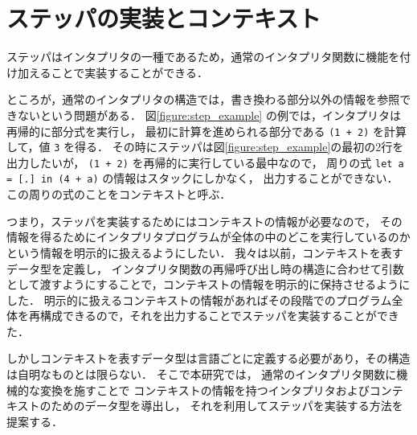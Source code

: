 \section{ステッパの実装とコンテキスト}
\label{section:context}

ステッパはインタプリタの一種であるため，通常のインタプリタ関数に機能を付け加えることで実装することができる．

ところが，通常のインタプリタの構造では，書き換わる部分以外の情報を参照できないという問題がある．
図\ref{figure:step_example} の例では，インタプリタは再帰的に部分式を実行し，
最初に計算を進められる部分である \texttt{(1 + 2)} を計算して，値 \texttt{3} を得る．
その時にステッパは図\ref{figure:step_example}の最初の2行を出力したいが，
\texttt{(1 + 2)} を再帰的に実行している最中なので，
周りの式 \texttt{let a = [.] in (4 + a)} の情報はスタックにしかなく，
出力することができない．
この周りの式のことをコンテキストと呼ぶ．

つまり，ステッパを実装するためにはコンテキストの情報が必要なので，
その情報を得るためにインタプリタプログラムが全体の中のどこを実行しているのかという情報を明示的に扱えるようにしたい．
我々は以前\cite{FCA19}，コンテキストを表すデータ型を定義し，
インタプリタ関数の再帰呼び出し時の構造に合わせて引数として渡すようにすることで，コンテキストの情報を明示的に保持させるようにした．
明示的に扱えるコンテキストの情報があればその段階でのプログラム全体を再構成できるので，それを出力することでステッパを実装することができた．

しかしコンテキストを表すデータ型は言語ごとに定義する必要があり，その構造は自明なものとは限らない．
そこで本研究では，
通常のインタプリタ関数に機械的な変換を施すことで
コンテキストの情報を持つインタプリタおよびコンテキストのためのデータ型を導出し，
それを利用してステッパを実装する方法を提案する．
